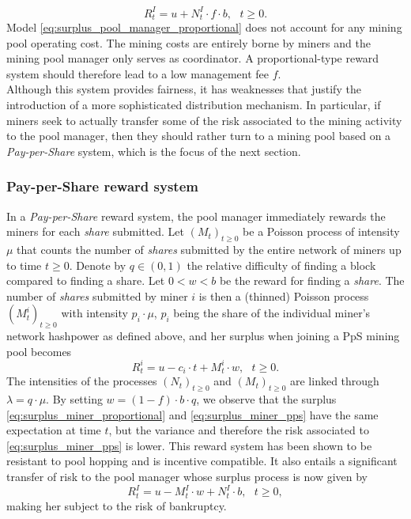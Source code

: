 \begin{equation}\label{eq:surplus_pool_manager_proportional} 
R_t^I = u + N^I_t\cdot f\cdot b,\text{ }t\geq0.
\end{equation}
Model \eqref{eq:surplus_pool_manager_proportional} does not account for any mining pool operating cost. The mining costs are entirely borne by miners and the mining pool manager only serves as coordinator. A proportional-type reward system should therefore lead to a low management fee $f$. \\

\noindent Although this system provides fairness, it has weaknesses that justify the introduction of a more sophisticated distribution mechanism. In particular, if miners seek to actually transfer some of the risk associated to the mining activity to the pool manager, then they should rather turn to a mining pool based on a \textit{Pay-per-Share} system, which is the focus of the next section.
\subsubsection{Pay-per-Share reward system}\label{eq:pps}
In a \textit{Pay-per-Share} reward system, the pool manager immediately rewards the miners for each \textit{share} submitted. Let $(M_t)_{t\geq0}$ be a Poisson process of intensity $\mu$ that counts the number of \textit{shares} submitted by the entire network of miners up to time $t\geq0$. Denote by $q\in(0,1)$ the relative difficulty of finding a block compared to finding a share. Let $0<w<b$ be the reward for finding a \textit{share}. The number of \textit{shares} submitted by miner $i$ is then a (thinned) Poisson process $(M^i_t)_{t\geq0}$ with intensity $p_i\cdot\mu$, $p_i$ being the share of the individual miner's network hashpower as defined above, and her surplus when joining a PpS mining pool becomes  
\begin{equation}\label{eq:surplus_miner_pps}
R_t^i = u - c_i\cdot t + M^i_t\cdot w,\text{ }t\geq0. 
\end{equation}
The intensities of the processes $(N_t)_{t\geq0}$ and $(M_t)_{t\geq0}$ are linked through $\lambda  = q\cdot\mu$. By setting $w=(1-f)\cdot b\cdot q$, we observe that the surplus \eqref{eq:surplus_miner_proportional} and \eqref{eq:surplus_miner_pps} have the same expectation at time $t$, but the variance and therefore the risk associated to \eqref{eq:surplus_miner_pps} is lower. This reward system has been shown to be resistant to pool hopping and is incentive compatible. It also entails a significant transfer of risk to the pool manager whose surplus process is now given by
\begin{equation}\label{eq:surplus_manager_pps}
R^I_t = u - M_t^I\cdot w + N_t^I\cdot b,\text{ }t\geq0,
\end{equation}
making her subject to the risk of bankruptcy.

